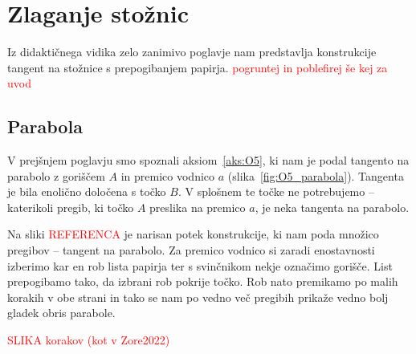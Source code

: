 \section{Zlaganje stožnic}
\label{pogl:stoznice}


Iz didaktičnega vidika zelo zanimivo poglavje nam predstavlja konstrukcije tangent na stožnice s prepogibanjem papirja. \textcolor{red}{pogruntej in poblefirej še kej za uvod}

\subsection{Parabola}

V prejšnjem poglavju smo spoznali aksiom~\ref{aks:O5}, ki nam je podal tangento na parabolo z goriščem $A$ in premico vodnico $a$ (slika~\ref{fig:O5_parabola}). Tangenta je bila enolično določena s točko $B$. V splošnem te točke ne potrebujemo -- katerikoli pregib, ki točko $A$ preslika na premico $a$, je neka tangenta na parabolo.

Na sliki \textcolor{red}{REFERENCA} je narisan potek konstrukcije, ki nam poda množico pregibov -- tangent na parabolo. Za premico vodnico si zaradi enostavnosti izberimo kar en rob lista papirja ter s svinčnikom nekje označimo gorišče. List prepogibamo tako, da izbrani rob pokrije točko. Rob nato premikamo po malih korakih v obe strani in tako se nam po vedno več pregibih prikaže vedno bolj gladek obris parabole.

\textcolor{red}{SLIKA korakov (kot v Zore2022)}

